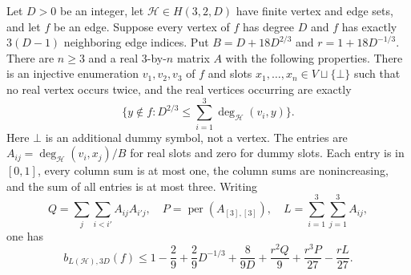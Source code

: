 \begin{lemma}
Let $D>0$ be an integer, let $\mathcal H\in H(3,2,D)$ have finite vertex
and edge sets, and let $f$ be an edge. Suppose every vertex of $f$ has degree
$D$ and $f$ has exactly $3(D-1)$ neighboring edge indices. Put
$B=D+18D^{2/3}$ and $r=1+18D^{-1/3}$.
There are $n\ge3$ and a real $3$-by-$n$ matrix $A$ with the following
properties. There is an injective enumeration $v_1,v_2,v_3$ of $f$ and
slots $x_1,\ldots,x_n\in V\sqcup\{\bot\}$ such that no real vertex
occurs twice, and the real vertices occurring are exactly
\[
\{y\notin f:D^{2/3}\le\sum_{i=1}^3\deg_{\mathcal H}(v_i,y)\}.
\]
Here $\bot$ is an additional dummy symbol, not a vertex. The entries are
$A_{ij}=\deg_{\mathcal H}(v_i,x_j)/B$ for real slots and zero for dummy
slots. Each entry is in $[0,1]$, every column sum is at most one, the column
sums are nonincreasing, and the sum of all entries is at most three.
Writing
\[
Q=\sum_j\sum_{i<i'}A_{ij}A_{i'j},\quad
P=\operatorname{per}(A_{[3],[3]}),\quad
L=\sum_{i=1}^3\sum_{j=1}^3 A_{ij},
\]
one has
\[
b_{L(\mathcal H),3D}(f)\le
1-\frac29+\frac29D^{-1/3}+\frac{8}{9D}
 +\frac{r^2Q}{9}+\frac{r^3P}{27}-\frac{rL}{27}.
\]
\end{lemma}
